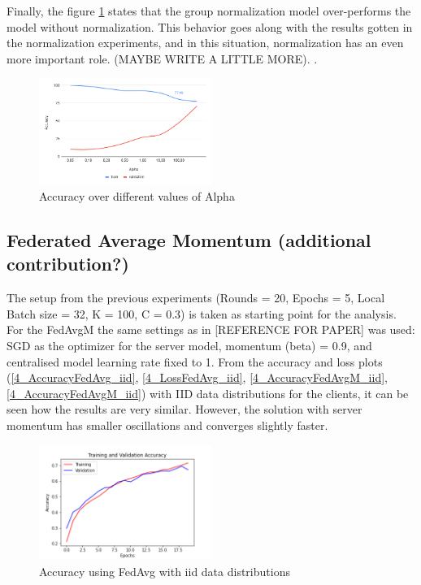 \documentclass[twocolumn]{article}
\begin{document}
Finally, the figure \ref{AccAlpha} states that the group normalization model over-performs the model without normalization. This behavior goes along with the results gotten in the normalization experiments, and in this situation, normalization has an even more important role. (MAYBE WRITE A LITTLE MORE).
.


\begin{figure}
    \centering
    \includegraphics[width=0.5\textwidth,height=.3\textheight]{alphaAccuracy.png}
    \caption{Accuracy over different values of Alpha}
    \label{AccAlpha} 
\end{figure}


\subsection{Federated Average Momentum (additional contribution?)}

The setup from the previous experiments (Rounds = 20, Epochs = 5, Local Batch size = 32, K = 100, C = 0.3) is taken as starting point for the analysis.
For the FedAvgM the same settings as in [REFERENCE FOR PAPER] was used: SGD as the optimizer for the server model,  momentum (beta) = 0.9, and centralised model learning rate fixed to 1.
From the accuracy and loss plots (\ref{4_AccuracyFedAvg_iid}, \ref{4_LossFedAvg_iid}, \ref{4_AccuracyFedAvgM_iid}, \ref{4_AccuracyFedAvgM_iid}) with IID data distributions for the clients, it can be seen how the results are very similar. However, the solution with server momentum has smaller oscillations and converges slightly faster. 

\begin{figure}
    \centering
    \includegraphics[width=0.5\textwidth,height=.3\textheight]{4_AccuracyFedAvg_iid.png}
    \caption{Accuracy using FedAvg with iid data distributions}
     \label{AccFedAvgIid} 
\end{figure}
\end{document}
